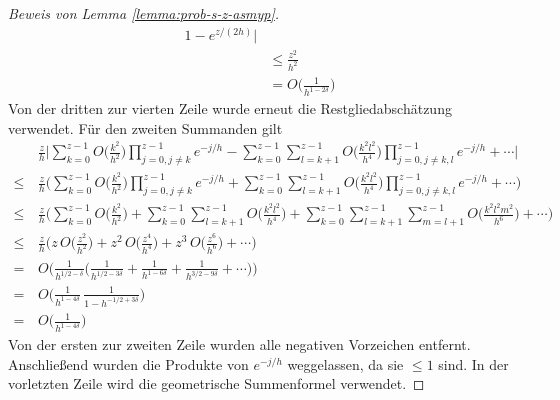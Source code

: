 \documentclass[a4paper, 11pt, ngerman]{article}
\theoremstyle{definition}
\theoremstyle{plain}
\theoremstyle{remark}
\begin{document}
\begin{proof}[Beweis von Lemma \ref{lemma:prob-s-z-asmyp}]
\begin{align*}
        1 - e^{z/(2h)}
        \Big \vert                                       \\
         & \le \frac {z^2} {h^2}                         \\
         & = O \bigg ( \frac 1 {h^{1 - 2\delta}} \bigg )
    \end{align*}
    Von der dritten zur vierten Zeile wurde erneut die Restgliedabschätzung verwendet. Für den zweiten Summanden gilt
    \begin{align*}
               & \frac z h \Bigg \vert
        \sum_{k = 0}^{z - 1} O \bigg ( \frac {k^2} {h^2} \bigg )
        \prod_{j = 0, j \ne k}^{z - 1} e^{-j/h}
        - \sum_{k = 0}^{z - 1}\sum_{l = k+1}^{z - 1}
        O \bigg ( \frac {k^2l^2} {h^4} \bigg )
        \prod_{j = 0, j \ne k,l}^{z - 1} e^{-j/h}
        + \cdots
        \Bigg \vert                                           \\
        \le \, & \frac z h \Bigg (
        \sum_{k = 0}^{z - 1} O \bigg ( \frac {k^2} {h^2} \bigg )
        \prod_{j = 0, j \ne k}^{z - 1} e^{-j/h}
        + \sum_{k = 0}^{z - 1}\sum_{l = k+1}^{z - 1}
        O \bigg ( \frac {k^2l^2} {h^4} \bigg )
        \prod_{j = 0, j \ne k,l}^{z - 1} e^{-j/h}
        + \cdots \Bigg )                                      \\
        \le \, & \frac z h \Bigg (
        \sum_{k = 0}^{z - 1} O \bigg ( \frac {k^2} {h^2} \bigg )
        + \sum_{k = 0}^{z - 1}\sum_{l = k+1}^{z - 1}
        O \bigg ( \frac {k^2l^2} {h^4} \bigg )
        + \sum_{k = 0}^{z - 1}\sum_{l = k+1}^{z - 1}\sum_{m = l + 1}^{z - 1}
        O \bigg ( \frac {k^2l^2m^2} {h^6} \bigg )
        + \cdots \Bigg )                                      \\
        \le \, & \frac z h \Bigg (
        z \, O \bigg ( \frac {z^2} {h^2} \bigg )
        + z^2 \, O \bigg ( \frac {z^4} {h^4} \bigg )
        + z^3 \, O \bigg ( \frac {z^6} {h^6} \bigg )
        + \cdots \Bigg )                                      \\
        = \,   & O \Bigg ( \frac 1 {h^{1/2 - \delta}} \bigg (
        \frac 1 {h^{1/2 - 3 \delta}} + \frac 1 {h^{1 - 6\delta}}
        + \frac 1 {h^{3/2 - 9\delta}} + \cdots
        \bigg ) \Bigg )                                       \\
        = \,   & O \Bigg ( \frac 1 {h^{1 - 4\delta}} \,
        \frac 1 {1 - h^{-1/2+3\delta}} \Bigg )                \\
        = \,   & O \bigg ( \frac 1 {h^{1 - 4\delta}} \bigg )
    \end{align*}
    Von der ersten zur zweiten Zeile wurden alle negativen Vorzeichen entfernt. Anschließend wurden die Produkte von $e^{-j/h}$ weggelassen, da sie $\le 1$ sind. In der vorletzten Zeile wird die geometrische Summenformel verwendet.
\end{proof}
\end{document}
